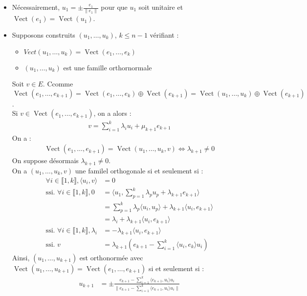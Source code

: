 \documentclass[../main.tex]{subfiles}
\begin{document}
\begin{itemize}
    \item Nécessairement, $u_1 = \pm \frac{e_1}{\|e_1\|}$ pour que $u_1$ soit unitaire et $\operatorname{Vect}(e_1) = \operatorname{Vect}(u_1)$.
    \item Supposons construits $(u_1, \ldots, u_k)$, $k\leq n-1$ vérifiant :
    \begin{itemize}
        \item $Vect(u_1, \ldots, u_k) = \operatorname{Vect}(e_1, \ldots, e_k)$
        \item $(u_1, \ldots, u_k)$ est une famille orthornormale
    \end{itemize}
    Soit $v\in E$. Ccomme $\operatorname{Vect}(e_1, \ldots, e_{k+1}) = \operatorname{Vect}(e_1, \ldots, e_k) \oplus \operatorname{Vect}(e_{k+1}) = \operatorname{Vect}(u_1, \ldots, u_k) \oplus \operatorname{Vect}(e_{k+1})$. \\
    Si $v\in \operatorname{Vect}(e_1, \ldots, e_{k+1})$, on a alors : 
    \begin{align*}
        v = \sum_{i=1}^{k} \lambda_i u_i + \mu_{k+1} e_{k+1}
    \end{align*}
    On a : 
    \begin{align*}
        \operatorname{Vect}(e_1, \ldots, e_{k+1}) = \operatorname{Vect}(u_1, \ldots, u_k, v) \Leftrightarrow \lambda_{k+1}\neq 0
    \end{align*}
    On suppose désormais $\lambda_{k+1}\neq 0$. \\
    On a $(u_1 ,\ldots, u_k, v)$ une familel orthogonale si et seulement si : 
    \begin{align*}
        \forall i\in \llbracket 1, k \rrbracket, \langle u_i, v \rangle &= 0 \\
        \text{ssi. } \forall i\in \llbracket 1, k \rrbracket, 0 &= \langle u_1, \sum_{p=1}^{k} \lambda_p u_p + \lambda_{k+1} e_{k+1} \rangle \\
        &= \sum_{p=1}^{k} \lambda_p \langle u_i, u_p \rangle + \lambda_{k+1} \langle u_i, e_{k+1} \rangle \\
        &= \lambda_i + \lambda_{k+1} \langle u_i, e_{k+1} \rangle \\
        \text{ssi. } \forall i\in \llbracket 1, k \rrbracket, \lambda_i &= -\lambda_{k+1} \langle u_i, e_{k+1} \rangle \\
        \text{ssi. } v &= \lambda_{k+1} (e_{k+1} - \sum_{i=1}^{k} \langle u_i, e_k\rangle u_i)
    \end{align*}
    Ainsi, $(u_1, \ldots, u_{k+1})$ est orthonormée avec $\operatorname{Vect}(u_1, \ldots, u_{k+1}) = \operatorname{Vect}(e_1, \ldots, e_{k+1})$ si et seulement si : 
    \begin{align*}
        u_{k+1} &= \pm \frac{e_{k+1} - \sum\limits_{i=1}^{k} \langle e_{k+1}, u_i\rangle u_i}{\|e_{k+1} - \sum\limits_{i=1}^{k} \langle e_{k+1}, u_i\rangle u_i\|}
    \end{align*}
\end{itemize}
\end{document}

